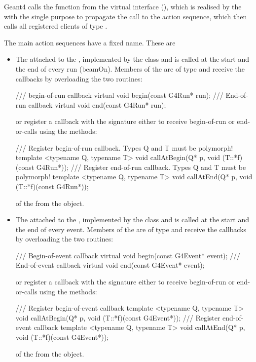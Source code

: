 \noindent
Geant4 calls the function from the virtual interface (), 
which is realised by the  with the single purpose to
propagate the call to the action sequence, which then calls all registered clients
of type .

\noindent
The main action sequences have a fixed name. These are
\begin{itemize}

\item The  attached to the , implemented 
    by the  class and is called at the start and the end of 
    every run (beamOn). Members of the  are of type
     and receive the callbacks by overloading the two routines:
\begin{unnumberedcode}
/// begin-of-run callback
virtual void begin(const G4Run* run);
/// End-of-run callback
virtual void end(const G4Run* run);
\end{unnumberedcode}
    or register a callback with the signature {}
    either to receive begin-of-run or end-or-calls using the methods:
\begin{unnumberedcode}
/// Register begin-of-run callback. Types Q and T must be polymorph!
template <typename Q, typename T> void callAtBegin(Q* p, void (T::*f)(const G4Run*));
/// Register end-of-run callback. Types Q and T must be polymorph!
template <typename Q, typename T> void callAtEnd(Q* p, void (T::*f)(const G4Run*));
\end{unnumberedcode}
    of the  from the  object.


\item The  attached to the , implemented 
    by the  class and is called at the start and the end of 
    every event. Members of the  are of type
     and receive the callbacks by overloading the two routines:
\begin{unnumberedcode}
/// Begin-of-event callback
virtual void begin(const G4Event* event);
/// End-of-event callback
virtual void end(const G4Event* event);
\end{unnumberedcode}
    or register a callback with the signature {}
    either to receive begin-of-run or end-or-calls using the methods:
\begin{unnumberedcode}
/// Register begin-of-event callback
template <typename Q, typename T> void callAtBegin(Q* p, void (T::*f)(const G4Event*));
/// Register end-of-event callback
template <typename Q, typename T> void callAtEnd(Q* p, void (T::*f)(const G4Event*));
\end{unnumberedcode}
    of the  from the  object.



\end{itemize}
